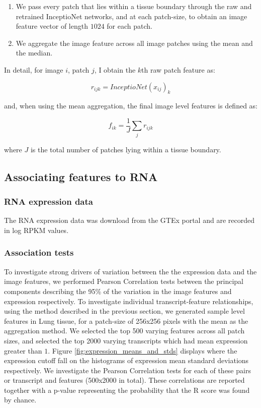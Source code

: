 \documentclass{article}
\begin{document}
\begin{enumerate}
\item We pass every patch that lies within a tissue boundary through the raw and retrained InceptioNet networks, and at each patch-size, to obtain an image feature vector of length $1024$ for each patch.
 \item We aggregate the image feature across all image patches using the mean and the median.
\end{enumerate}
In detail, for image $i$, patch $j$, I obtain the $k$th raw patch feature as:

$$r_{ijk} =  InceptioNet(x_{ij})_k$$

and, when using the mean aggregation, the final image level features is defined as:

$$f_{ik} = \frac{1}{J}\sum_j r_{ijk}$$

where $J$ is the total number of patches lying within a tissue boundary.

\subsection{Associating features to RNA}

\subsubsection{RNA expression data}

The RNA expression data was download from the GTEx portal and are recorded in log RPKM values.

\subsubsection{Association tests}

To investigate strong drivers of variation between the the expression data and the image features, we performed Pearson Correlation tests between the principal components describing the 95\% of the variation in the image features and expression respectively. To investigate individual transcript-feature relationships, using the method described in the previous section, we generated sample level features in Lung tissue, for a patch-size of 256x256 pixels with the mean as the aggregation method. We selected the top 500 varying features across all patch sizes, and selected the top 2000 varying transcripts which had mean expression greater than $1$. Figure \ref{fig:expression_means_and_stds} displays where the expression cutoff fall on the histograms of expression mean standard deviations respectively. We investigate the Pearson Correlation tests for each of these pairs or transcript and features (500x2000 in total). These correlations are reported together with a p-value representing the probability that the R score was found by chance.
\end{document}
